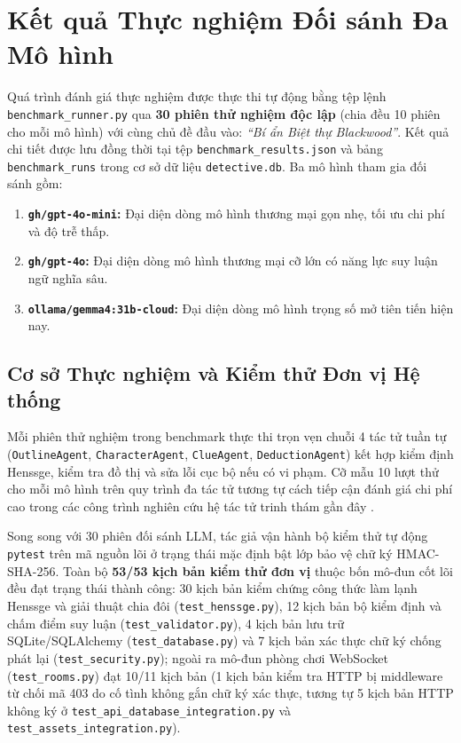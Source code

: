 \section{Kết quả Thực nghiệm Đối sánh Đa Mô hình}
\label{sec:eval_benchmark_results}

Quá trình đánh giá thực nghiệm được thực thi tự động bằng tệp lệnh \texttt{benchmark\_runner.py} qua \textbf{30 phiên thử nghiệm độc lập} (chia đều 10 phiên cho mỗi mô hình) với cùng chủ đề đầu vào: \textit{``Bí ẩn Biệt thự Blackwood''}. Kết quả chi tiết được lưu đồng thời tại tệp \texttt{benchmark\_results.json} và bảng \texttt{benchmark\_runs} trong cơ sở dữ liệu \texttt{detective.db}. Ba mô hình tham gia đối sánh gồm:
\begin{enumerate}
    \item \textbf{\texttt{gh/gpt-4o-mini}:} Đại diện dòng mô hình thương mại gọn nhẹ, tối ưu chi phí và độ trễ thấp.
    \item \textbf{\texttt{gh/gpt-4o}:} Đại diện dòng mô hình thương mại cỡ lớn có năng lực suy luận ngữ nghĩa sâu.
    \item \textbf{\texttt{ollama/gemma4:31b-cloud}:} Đại diện dòng mô hình trọng số mở tiên tiến hiện nay.
\end{enumerate}

\subsection{Cơ sở Thực nghiệm và Kiểm thử Đơn vị Hệ thống}
Mỗi phiên thử nghiệm trong benchmark thực thi trọn vẹn chuỗi 4 tác tử tuần tự (\texttt{OutlineAgent}, \texttt{CharacterAgent}, \texttt{ClueAgent}, \texttt{DeductionAgent}) kết hợp kiểm định Henssge, kiểm tra đồ thị và sửa lỗi cục bộ nếu có vi phạm. Cỡ mẫu 10 lượt thử cho mỗi mô hình trên quy trình đa tác tử tương tự cách tiếp cận đánh giá chi phí cao trong các công trình nghiên cứu hệ tác tử trinh thám gần đây \cite{wu2024deciphering, li2024contradoc}.

Song song với 30 phiên đối sánh LLM, tác giả vận hành bộ kiểm thử tự động \texttt{pytest} trên mã nguồn lõi ở trạng thái mặc định bật lớp bảo vệ chữ ký HMAC-SHA-256. Toàn bộ \textbf{53/53 kịch bản kiểm thử đơn vị} thuộc bốn mô-đun cốt lõi đều đạt trạng thái thành công: 30 kịch bản kiểm chứng công thức làm lạnh Henssge và giải thuật chia đôi (\texttt{test\_henssge.py}), 12 kịch bản bộ kiểm định và chấm điểm suy luận (\texttt{test\_validator.py}), 4 kịch bản lưu trữ SQLite/SQLAlchemy (\texttt{test\_database.py}) và 7 kịch bản xác thực chữ ký chống phát lại (\texttt{test\_security.py}); ngoài ra mô-đun phòng chơi WebSocket (\texttt{test\_rooms.py}) đạt 10/11 kịch bản (1 kịch bản kiểm tra HTTP bị middleware từ chối mã 403 do cố tình không gắn chữ ký xác thực, tương tự 5 kịch bản HTTP không ký ở \texttt{test\_api\_database\_integration.py} và \texttt{test\_assets\_integration.py}).

